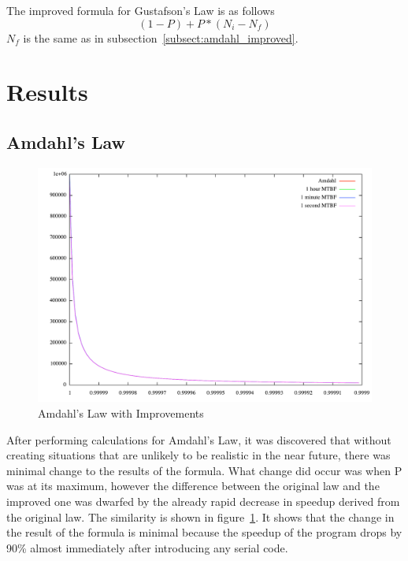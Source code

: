\documentclass[]{article}
\begin{document}
The improved formula for Gustafson's Law is as follows $$(1-P) + P * (N_i - N_f)$$ $N_f$ is the same as in subsection~\ref{subsect:amdahl_improved}. 

\section{Results}
\label{sect:results}


\subsection{Amdahl's Law}
\label{subsect:amdahl_results}

\begin{figure}
	\begin{center}
		\includegraphics[scale=0.25]{AmdImp.pdf}
		\caption{\small Amdahl's Law with Improvements}
		\label{fig:amdahl_improved}
	\end{center}
\end{figure}

After performing calculations for Amdahl's Law, it was discovered that without creating situations that are unlikely to be realistic in the near future, there was minimal change to the results of the formula. What change did occur was when P was at its maximum, however the difference between the original law and the improved one was dwarfed by the already rapid decrease in speedup derived from the original law. The similarity is shown in figure~\ref{fig:amdahl_improved}. It shows that the change in the result of the formula is minimal because the speedup of the program drops by 90\% almost immediately after introducing any serial code.
\end{document}
